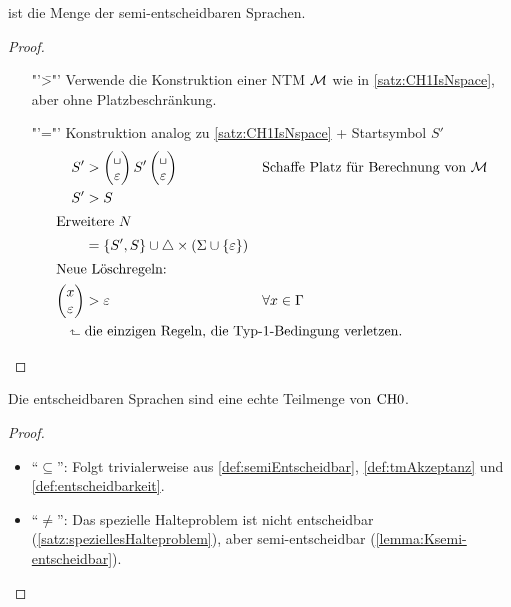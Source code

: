 
\begin{Satz}\label{satz:6.6}
 ist die Menge der semi-entscheidbaren Sprachen.
\end{Satz}
\begin{proof}
	\begin{itemize}
	\item["'\=>"'] Verwende die Konstruktion einer \ac{NTM} $\mathcal{M}$ wie in \autoref{satz:CH1IsNspace}, aber ohne Platzbeschränkung.
	\item["'\<="'] Konstruktion analog zu \autoref{satz:CH1IsNspace} + Startsymbol $S'$
	\begin{align*}
		S' &\-> \pmqty{\blank\\\Eps} S' \pmqty{\blank\\\Eps} &&\text{Schaffe Platz für Berechnung von }\M\\
		S' &\-> S\\
	\shortintertext{Erweitere $N$}
		&= \{S',S\}\cup\triangle\x(\Sigma\cup\{\Eps\})\\
	\shortintertext{Neue Löschregeln:}
		\pmqty{x\\ \Eps } &\-> \Eps &&\forall x\in\Gamma\\
		\rotatebox{90}{$\Rsh$}\ &\mathrlap{\text{die einzigen
                                          Regeln, die Typ-1-Bedingung verletzen.}} \tag*{\qedhere}
	\end{align*}
	\end{itemize}
\end{proof}

\begin{Satz}
 Die entscheidbaren Sprachen sind eine echte Teilmenge von $\text{CH{0}}$.
\end{Satz}
\begin{proof}~
 \begin{itemize}
  \item "`$\subseteq$"':
  Folgt trivialerweise aus \autoref{def:semiEntscheidbar}, \autoref{def:tmAkzeptanz} und \autoref{def:entscheidbarkeit}.
  
  \item "`$\neq$"':
  Das spezielle Halteproblem ist nicht entscheidbar (\autoref{satz:speziellesHalteproblem}),
  aber semi-entscheidbar (\autoref{lemma:Ksemi-entscheidbar}).
  \qedhere
 \end{itemize}
\end{proof}




